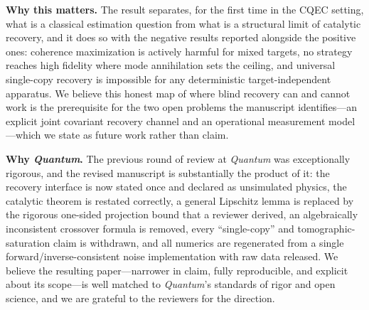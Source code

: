 \documentclass[11pt,a4paper]{article}
\begin{document}
\textbf{Why this matters.}
The result separates, for the first time in the CQEC setting, what is a classical estimation question from what is a structural limit of catalytic recovery, and it does so with the negative results reported alongside the positive ones: coherence maximization is actively harmful for mixed targets, no strategy reaches high fidelity where mode annihilation sets the ceiling, and universal single-copy recovery is impossible for any deterministic target-independent apparatus.
We believe this honest map of where blind recovery can and cannot work is the prerequisite for the two open problems the manuscript identifies---an explicit joint covariant recovery channel and an operational measurement model---which we state as future work rather than claim.

\textbf{Why \emph{Quantum}.}
The previous round of review at \emph{Quantum} was exceptionally rigorous, and the revised manuscript is substantially the product of it: the recovery interface is now stated once and declared as unsimulated physics, the catalytic theorem is restated correctly, a general Lipschitz lemma is replaced by the rigorous one-sided projection bound that a reviewer derived, an algebraically inconsistent crossover formula is removed, every ``single-copy'' and tomographic-saturation claim is withdrawn, and all numerics are regenerated from a single forward/inverse-consistent noise implementation with raw data released.
We believe the resulting paper---narrower in claim, fully reproducible, and explicit about its scope---is well matched to \emph{Quantum}'s standards of rigor and open science, and we are grateful to the reviewers for the direction.

\medskip
\end{document}
